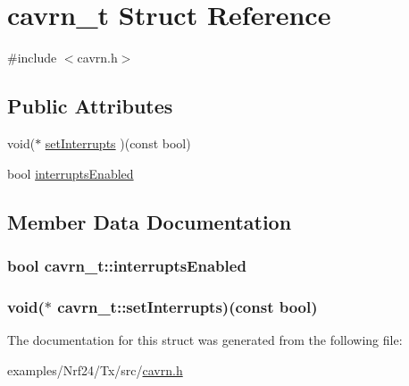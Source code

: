 \hypertarget{structcavrn__t}{}\section{cavrn\+\_\+t Struct Reference}
\label{structcavrn__t}


{\ttfamily \#include $<$cavrn.\+h$>$}

\subsection*{Public Attributes}
\begin{DoxyCompactItemize}
\item 
void($\ast$ \hyperlink{structcavrn__t_a0d00188fb0b8d59a4d7f4be38d56ff52}{set\+Interrupts} )(const bool)
\item 
bool \hyperlink{structcavrn__t_afe63f8114e4661a212dda80f63c4ad23}{interrupts\+Enabled}
\end{DoxyCompactItemize}


\subsection{Member Data Documentation}
\hypertarget{structcavrn__t_afe63f8114e4661a212dda80f63c4ad23}{}
\subsubsection[{interrupts\+Enabled}]{\setlength{\rightskip}{0pt plus 5cm}bool cavrn\+\_\+t\+::interrupts\+Enabled}\label{structcavrn__t_afe63f8114e4661a212dda80f63c4ad23}
\hypertarget{structcavrn__t_a0d00188fb0b8d59a4d7f4be38d56ff52}{}
\subsubsection[{set\+Interrupts}]{\setlength{\rightskip}{0pt plus 5cm}void($\ast$ cavrn\+\_\+t\+::set\+Interrupts)(const bool)}\label{structcavrn__t_a0d00188fb0b8d59a4d7f4be38d56ff52}


The documentation for this struct was generated from the following file\+:\begin{DoxyCompactItemize}
\item 
examples/\+Nrf24/\+Tx/src/\hyperlink{examples_2Nrf24_2Tx_2src_2cavrn_8h}{cavrn.\+h}\end{DoxyCompactItemize}
